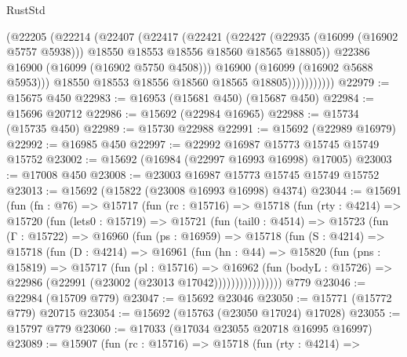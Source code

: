 \begin{lexlean}{RustStd}
\begin{coremodule}
                      (@22205
                        (@22214
                          (@22407
                            (@22417
                              (@22421
                                (@22427
                                  (@22935 (@16099 (@16902 @5757 @5938)))
                                  @18550
                                  @18553
                                  @18556
                                  @18560
                                  @18565
                                  @18805))
                              @22386
                              @16900
                              (@16099 (@16902 @5750 @4508)))
                            @16900
                            (@16099 (@16902 @5688 @5953)))
                          @18550
                          @18553
                          @18556
                          @18560
                          @18565
                          @18805)))))))))))
@22979 := @15675 @450
@22983 := @16953 (@15681 @450) (@15687 @450)
@22984 := @15696 @20712
@22986 := @15692 (@22984 @16965)
@22988 := @15734 (@15735 @450)
@22989 := @15730 @22988
@22991 := @15692 (@22989 @16979)
@22992 := @16985 @450
@22997 := @22992 @16987 @15773 @15745 @15749 @15752
@23002 := @15692 (@16984 (@22997 @16993 @16998) @17005)
@23003 := @17008 @450
@23008 := @23003 @16987 @15773 @15745 @15749 @15752
@23013 := @15692 (@15822 (@23008 @16993 @16998) @4374)
@23044 := @15691
    (fun (fn : @76) =>
    @15717
      (fun (rc : @15716) =>
      @15718
        (fun (rty : @4214) =>
        @15720
          (fun (lets0 : @15719) =>
          @15721
            (fun (tail0 : @4514) =>
            @15723
              (fun (Γ : @15722) =>
              @16960
                (fun (ps : @16959) =>
                @15718
                  (fun (S : @4214) =>
                  @15718
                    (fun (D : @4214) =>
                    @16961
                      (fun (hn : @44) =>
                      @15820
                        (fun (pns : @15819) =>
                        @15717
                          (fun (pl : @15716) =>
                          @16962
                            (fun (bodyL : @15726) =>
                            @22986 (@22991 (@23002 (@23013 @17042))))))))))))))))
    @779
@23046 := @22984 (@15709 @779)
@23047 := @15692 @23046
@23050 := @15771 (@15772 @779) @20715
@23054 := @15692 (@15763 (@23050 @17024) @17028)
@23055 := @15797 @779
@23060 := @17033 (@17034 @23055 @20718 @16995 @16997)
@23089 := @15907
    (fun (rc : @15716) =>
    @15718
      (fun (rty : @4214) =>

\end{coremodule}
\end{lexlean}
